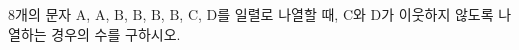8개의 문자 $\mathrm{A}$, $\mathrm{A}$, $\mathrm{B}$, $\mathrm{B}$, $\mathrm{B}$, $\mathrm{B}$, $\mathrm{C}$, $\mathrm{D}$를 일렬로 나열할 때, $\mathrm{C}$와 $\mathrm{D}$가 이웃하지 않도록 나열하는 경우의 수를 구하시오.
